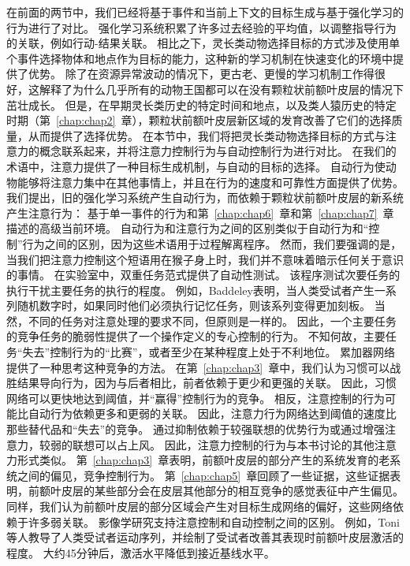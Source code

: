 在前面的两节中，我们已经将基于事件和当前上下文的目标生成与基于强化学习的行为进行了对比。
强化学习系统积累了许多过去经验的平均值，以调整指导行为的关联，例如行动-结果关联。
相比之下，灵长类动物选择目标的方式涉及使用单个事件选择物体和地点作为目标的能力，这种新的学习机制在快速变化的环境中提供了优势。
除了在资源异常波动的情况下，更古老、更慢的学习机制工作得很好，这解释了为什么几乎所有的动物王国都可以在没有颗粒状前额叶皮层的情况下茁壮成长。
但是，在早期灵长类历史的特定时间和地点，以及类人猿历史的特定时期（第~\ref{chap:chap2}~章），颗粒状前额叶皮层新区域的发育改善了它们的选择质量，从而提供了选择优势。
在本节中，我们将把灵长类动物选择目标的方式与注意力的概念联系起来，并将注意力控制行为与自动控制行为进行对比。
在我们的术语中，注意力提供了一种目标生成机制，与自动的目标的选择。
自动行为使动物能够将注意力集中在其他事情上，并且在行为的速度和可靠性方面提供了优势。
我们提出，旧的强化学习系统产生自动行为，而依赖于颗粒状前额叶皮层的新系统产生注意行为：
基于单一事件的行为和第~\ref{chap:chap6}~章和第~\ref{chap:chap7}~章描述的高级当前环境。
自动行为和注意行为之间的区别类似于自动行为和“控制”行为之间的区别，因为这些术语用于过程解离程序。
然而，我们要强调的是，当我们把注意力控制这个短语用在猴子身上时，我们并不意味着暗示任何关于意识的事情。
在实验室中，双重任务范式提供了自动性测试。
该程序测试次要任务的执行干扰主要任务的执行的程度。
例如，Baddeley\cite{shallice1996domain}表明，当人类受试者产生一系列随机数字时，如果同时他们必须执行记忆任务，则该系列变得更加刻板。
当然，不同的任务对注意处理的要求不同，但原则是一样的。
因此，一个主要任务的竞争任务的脆弱性提供了一个操作定义的专心控制的行为。
不知何故，主要任务“失去”控制行为的“比赛”，或者至少在某种程度上处于不利地位。
累加器网络提供了一种思考这种竞争的方法。
在第~\ref{chap:chap3}~章中，我们认为习惯可以战胜结果导向行为，因为与后者相比，前者依赖于更少和更强的关联。
因此，习惯网络可以更快地达到阈值，并“赢得”控制行为的竞争。
相反，注意控制的行为可能比自动行为依赖更多和更弱的关联。
因此，注意力行为网络达到阈值的速度比那些替代品和“失去”的竞争。
通过抑制依赖于较强联想的优势行为或通过增强注意力，较弱的联想可以占上风。
因此，注意力控制的行为与本书讨论的其他注意力形式类似。
第~\ref{chap:chap3}~章表明，前额叶皮层的部分产生的系统发育的老系统之间的偏见，竞争控制行为。
第~\ref{chap:chap5}~章回顾了一些证据，这些证据表明，前额叶皮层的某些部分会在皮层其他部分的相互竞争的感觉表征中产生偏见。
同样，我们认为前额叶皮层的部分区域会产生对目标生成网络的偏好，这些网络依赖于许多弱关联。
影像学研究支持注意控制和自动控制之间的区别。
例如，Toni等人\cite{toni1998time}教导了人类受试者运动序列，并绘制了受试者改善其表现时前额叶皮层激活的程度。
大约45分钟后，激活水平降低到接近基线水平。
